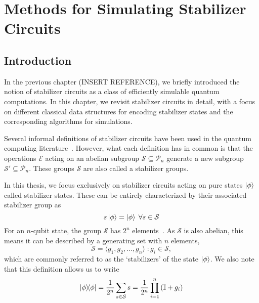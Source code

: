
\chapter[Methods for Simulating Stabilizer Circuits]{Methods for Simulating Stabilizer\\ Circuits}
\label{chap:stabilizers}

\section{Introduction}\label{sec:stabilizer-intro}
In the previous chapter (INSERT REFERENCE), we briefly introduced the notion of stabilizer circuits as a class of efficiently simulable quantum computations. In this chapter, we revisit stabilizer circuits in detail, with a focus on different classical data structures for encoding stabilizer states and the corresponding algorithms for simulations.\par
Several informal definitions of stabilizer circuits have been used in the quantum computing literature~\cite{Gottesman1998b,Aaronson2004,VandenNest2008,Seddon2019}. However, what each definition has in common is that the operations $\mathcal{E}$ acting on an abelian subgroup $\mathcal{S} \subseteq \mathcal{P}_{n}$ generate a new subgroup $\mathcal{S'}\subseteq \mathcal{P}_{n}$. These groups $\mathcal{S}$ are also called a stabilizer groups.\par
In this thesis, we focus exclusively on stabilizer circuits acting on pure states $\ket{\phi}$ called stabilizer states. These can be entirely characterized by their associated stabilizer group as
\begin{equation}
    s\ket{\phi}=\ket{\phi}\;\forall s\in\mathcal{S}
\end{equation}
For an $n$-qubit state, the group $\mathcal{S}$ has $2^{n}$ elements~\cite{Gottesman1998b}. As $\mathcal{S}$ is also abelian, this means it can be described by a generating set with $n$ elements,
\begin{equation}
    \mathcal{S} = \langle g_{1}, g_{2},\dots,g_{n}\rangle \; : g_{i}\in\mathcal{S},
\end{equation}
which are commonly referred to as the `stabilizers' of the state $\ket{\phi}$. We also note that this definition allows us to write
\begin{equation}
    \ketbra{\phi} = \frac{1}{2^{n}}\sum_{s\in\mathcal{S}} s = \frac{1}{2^{n}}\prod_{i=1}^{n}\left(\mathbb{I}+g_{i}\right)
\end{equation}
